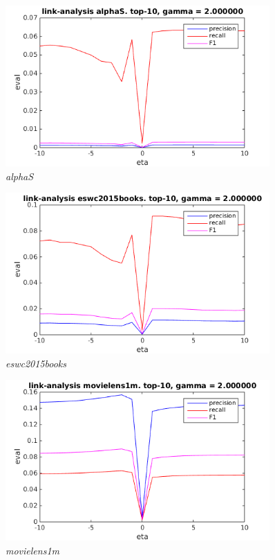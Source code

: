 \begin{figure}[h!]
  \centering
    \includegraphics[width=0.9\textwidth]{fig/link_eta/alphaS_link_eta.png}
    \caption{\textit{alphaS}}
    \vspace{-10pt}
\end{figure}

\begin{figure}[h!]
  \centering
    \includegraphics[width=0.9\textwidth]{fig/link_eta/eswc2015books_link_eta.png}
    \caption{\textit{eswc2015books}}
    \vspace{-10pt}
\end{figure}

\begin{figure}[h!]
  \centering
    \includegraphics[width=0.9\textwidth]{fig/link_eta/movielens_link_eta.png}
    \caption{\textit{movielens1m}}
    \vspace{-10pt}
\end{figure}

